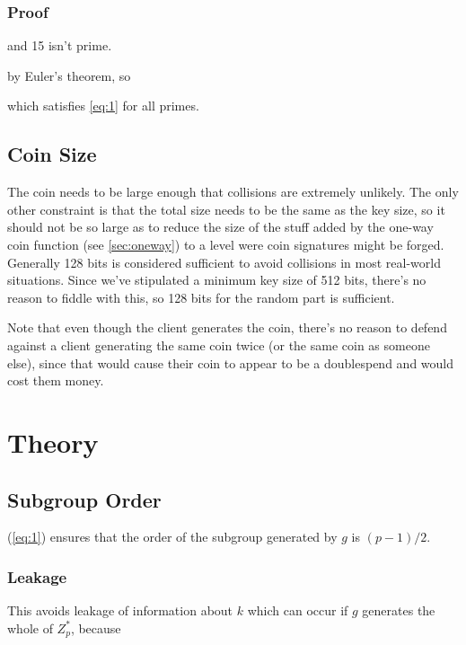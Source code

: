 \documentclass[a4paper,titlepage]{article}
\begin{document}
\subsubsection{Proof}


and 15 isn't prime.


by Euler's theorem, so


which satisfies \ref{eq:1} for all primes.

\subsection{Coin Size}

The coin needs to be large enough that collisions are extremely
unlikely. The only other constraint is that the total size needs to be
the same as the key size, so it should not be so large as to reduce
the size of the stuff added by the one-way coin function (see
\ref{sec:oneway}) to a level were coin signatures might be
forged. Generally 128 bits is considered sufficient to avoid
collisions in most real-world situations. Since we've stipulated a
minimum key size of 512 bits, there's no reason to fiddle with this,
so 128 bits for the random part is sufficient.

Note that even though the client generates the coin, there's no reason
to defend against a client generating the same coin twice (or the same
coin as someone else), since that would cause their coin to appear to
be a doublespend and would cost them money.

\section{Theory}

\subsection{Subgroup Order}
\label{sec:theory1}

(\ref{eq:1}) ensures that the order of the subgroup generated by $g$ is
$(p-1)/2$.

\subsubsection{Leakage}

This avoids leakage of information about $k$ which can
occur if $g$ generates the whole of $Z_p^*$, because
\end{document}

